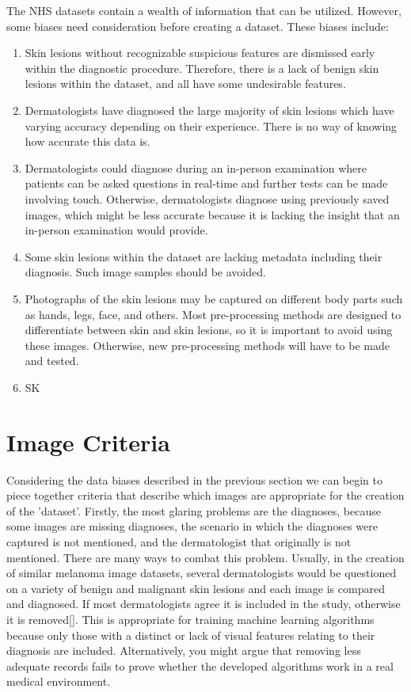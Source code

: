 The NHS datasets contain a wealth of information that can be utilized. However, some biases need consideration before creating a dataset. These biases include:
\begin{enumerate}
    \item Skin lesions without recognizable suspicious features are dismissed early within the diagnostic procedure. Therefore, there is a lack of benign skin lesions within the dataset, and all have some undesirable features.
    \item Dermatologists have diagnosed the large majority of skin lesions which have varying accuracy depending on their experience. There is no way of knowing how accurate this data is.
    \item Dermatologists could diagnose during an in-person examination where patients can be asked questions in real-time and further tests can be made involving touch. Otherwise, dermatologists diagnose using previously saved images, which might be less accurate because it is lacking the insight that an in-person examination would provide.
    \item Some skin lesions within the dataset are lacking metadata including their diagnosis. Such image samples should be avoided.
    \item Photographs of the skin lesions may be captured on different body parts such as hands, legs, face, and others. Most pre-processing methods are designed to differentiate between skin and skin lesions, so it is important to avoid using these images. Otherwise, new pre-processing methods will have to be made and tested.
    \item SK
\end{enumerate}

\section{Image Criteria}
Considering the data biases described in the previous section we can begin to piece together criteria that describe which images are appropriate for the creation of the 'dataset'. Firstly, the most glaring problems are the diagnoses, because some images are missing diagnoses, the scenario in which the diagnoses were captured is not mentioned, and the dermatologist that originally is not mentioned. There are many ways to combat this problem. Usually, in the creation of similar melanoma image datasets, several dermatologists would be questioned on a variety of benign and malignant skin lesions and each image is compared and diagnosed. If most dermatologists agree it is included in the study, otherwise it is removed[]. This is appropriate for training machine learning algorithms because only those with a distinct or lack of visual features relating to their diagnosis are included. Alternatively, you might argue that removing less adequate records fails to prove whether the developed algorithms work in a real medical environment.


